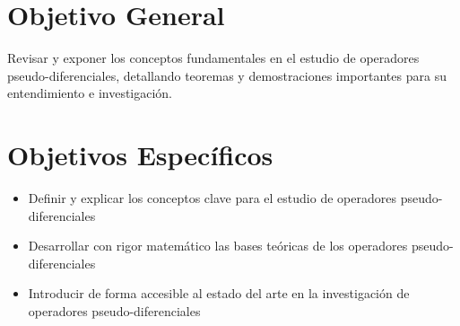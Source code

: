 \section{Objetivo General}
Revisar y exponer los conceptos fundamentales en el estudio de operadores pseudo-diferenciales, detallando teoremas y demostraciones importantes para su entendimiento e investigación.

\section{Objetivos Específicos}
\begin{itemize}
    \item Definir y explicar los conceptos clave para el estudio de operadores pseudo-diferenciales
    \item Desarrollar con rigor matemático las bases teóricas de los operadores pseudo-diferenciales
    \item Introducir de forma accesible al estado del arte en la investigación de operadores pseudo-diferenciales
\end{itemize}